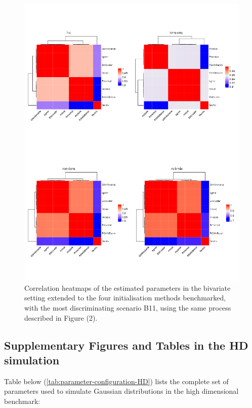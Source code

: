 \begin{figure}

{\centering \includegraphics[width=1\linewidth]{./figs/bivariate/heatmap_bivariate} 

}

\caption{Correlation heatmaps of the estimated parameters in the bivariate setting extended to the four initialisation methods benchmarked, with the most discriminating scenario B11, using the same process described in Figure (2).}\label{fig:heatmap-all-correlation-plots-bivariate}
\end{figure}

\hypertarget{supplementary-figures-and-tables-in-the-hd-simulation}{%
\subsection{Supplementary Figures and Tables in the HD simulation}\label{supplementary-figures-and-tables-in-the-hd-simulation}}

Table below (\ref{tab:parameter-configuration-HD}) lists the complete set of parameters used to simulate Gaussian distributions in the high dimensional benchmark:

